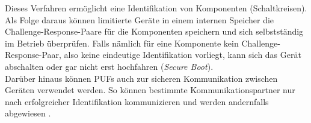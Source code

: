 \documentclass[conference]{IEEEtran}
\begin{document}
Dieses Verfahren ermöglicht eine Identifikation von Komponenten (Schaltkreisen). Als Folge daraus können limitierte Geräte in einem internen Speicher die Challenge-Response-Paare für die Komponenten speichern und sich selbstständig im Betrieb überprüfen. Falls nämlich für eine Komponente kein Challenge-Response-Paar, also keine eindeutige Identifikation vorliegt, kann sich das Gerät abschalten oder gar nicht erst hochfahren (\textit{Secure Boot})\cite{suhdev}.\\
Darüber hinaus können PUFs auch zur sicheren Kommunikation zwischen Geräten verwendet werden. So können bestimmte Kommunikationspartner nur nach erfolgreicher Identifikation kommunizieren und werden andernfalls abgewiesen \cite{itseciot, eckert2015}.
%
%



%
%
\end{document}
